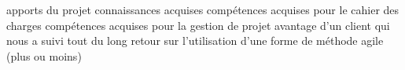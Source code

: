 apports du projet
connaissances acquises
compétences acquises pour le cahier des charges
compétences acquises pour la gestion de projet
avantage d'un client qui nous a suivi tout du long
retour sur l'utilisation d'une forme de méthode agile (plus ou moins)


\paragraph{}
